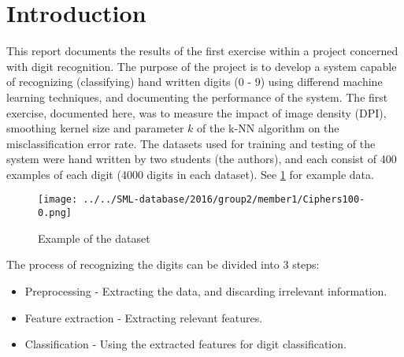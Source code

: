 \section{Introduction}
This report documents the results of the first exercise within
a project concerned with digit recognition.
The purpose of the project is to develop a system capable of recognizing
(classifying) hand written digits (0 - 9) using differend machine learning techniques,
and documenting the performance of the system.
The first exercise, documented here, was to measure the impact
of image density (DPI), smoothing kernel size and parameter \(k\)
of the k-NN algorithm on the misclassification error rate.
The datasets used for training and testing of the system
were hand written by two students (the authors), and each
consist of 400 examples of each digit (4000 digits in each dataset).
See \ref{fig:data} for example data.

\begin{figure}[H]
\centering
\texttt{[image: ../../SML-database/2016/group2/member1/Ciphers100-0.png]}
\caption{Example of the  dataset}
\label{fig:data}
\end{figure} 

The process of recognizing the digits can be divided into 3 steps:
\begin{itemize}
\item Preprocessing - Extracting the data, and discarding irrelevant information. 
\item Feature extraction - Extracting relevant features.
\item Classification - Using the extracted features for digit classification.
\end{itemize}